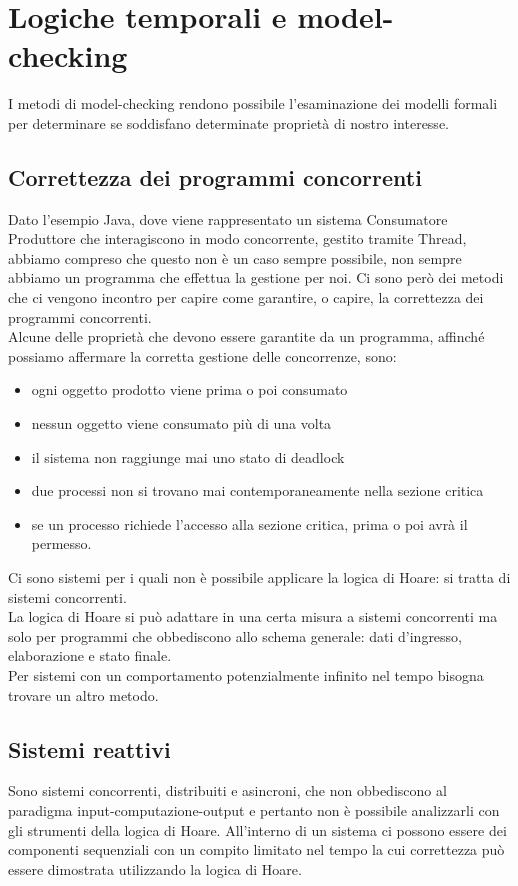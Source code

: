 \section{Logiche temporali e model-checking}
I metodi di model-checking rendono possibile l'esaminazione dei modelli formali per determinare se soddisfano determinate proprietà di nostro interesse. 
\subsection{Correttezza dei programmi concorrenti}
Dato l'esempio Java, dove viene rappresentato un sistema Consumatore Produttore che interagiscono in modo concorrente, gestito tramite Thread, abbiamo compreso che questo non è un caso sempre possibile, non sempre abbiamo un programma che effettua la gestione per noi. Ci sono però dei metodi che ci vengono incontro per capire come garantire, o capire, la correttezza dei programmi concorrenti.\\
Alcune delle proprietà che devono essere garantite da un programma, affinché possiamo affermare la corretta gestione delle concorrenze, sono:
\begin{itemize}
    \item ogni oggetto prodotto viene prima o poi consumato
    \item nessun oggetto viene consumato più di una volta
    \item il sistema non raggiunge mai uno stato di deadlock
    \item due processi non si trovano mai contemporaneamente nella sezione critica
    \item se un processo richiede l’accesso alla sezione critica, prima o poi avrà il permesso. 
\end{itemize} 
Ci sono sistemi per i quali non è possibile applicare la logica di Hoare: si tratta di sistemi concorrenti. \\
La logica di Hoare si può adattare in una certa misura a sistemi concorrenti ma solo per programmi che obbediscono allo schema generale: dati d’ingresso, elaborazione e stato finale. \\
Per sistemi con un comportamento potenzialmente infinito nel tempo bisogna trovare un altro metodo.

\subsection{Sistemi reattivi}
Sono sistemi concorrenti, distribuiti e asincroni, che non obbediscono al paradigma input-computazione-output e pertanto non è possibile analizzarli con gli strumenti della logica di Hoare.
All’interno di un sistema ci possono essere dei componenti sequenziali con un compito limitato nel tempo la cui correttezza può essere dimostrata utilizzando la logica di Hoare.

